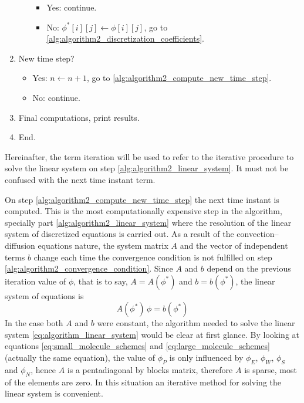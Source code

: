 \begin{algorithm}[ht]
\begin{algorithmic}[0]
\begin{enumerate}[label=\textbf{\arabic*},topsep=0pt]
\begin{enumerate}[label=\textbf{4.\arabic*}]
				\begin{itemize}
					\item Yes: continue.
					\item No: $\phi^\ast[i][j] \gets \phi[i][j]$, go to \ref{alg:algorithm2_discretization_coefficients}.
				\end{itemize}
			\end{enumerate}
			\item New time step?
			\begin{itemize}
				\item Yes: $n \gets n + 1$, go to \ref{alg:algorithm2_compute_new_time_step}.
				\item No: continue.
			\end{itemize}
			\item Final computations, print results.
			\item End.
		\end{enumerate}
	\end{algorithmic}
\end{algorithm}

Hereinafter, the term iteration will be used to refer to the iterative procedure
to solve the linear system on step \ref{alg:algorithm2_linear_system}. It must
not be confused with the next time instant term.

On step \ref{alg:algorithm2_compute_new_time_step} the next time instant is
computed. This is the most computationally expensive step in the algorithm,
specially part \ref{alg:algorithm2_linear_system} where the resolution of the
linear system of discretized equations is carried out. As a result of the
convection--diffusion equations nature, the system matrix $A$ and the vector of
independent terms $b$ change each time the convergence condition is not
fulfilled on step \eqref{alg:algorithm2_convergence_condition}. Since $A$ and
$b$ depend on the previous iteration value of $\phi$, that is to say, $A =
A(\phi^\ast)$ and $b = b(\phi^\ast)$, the linear system of equations is
\begin{equation} \label{eq:algorithm_linear_system}
	A(\phi^\ast) \, \phi = b(\phi^\ast)
\end{equation}
In the case both $A$ and $b$ were constant, the algorithm needed to solve the
linear system \eqref{eq:algorithm_linear_system} would be clear at first glance.
By looking at equations \eqref{eq:small_molecule_schemes} and
\eqref{eq:large_molecule_schemes} (actually the same equation), the value of
$\phi_P$ is only influenced by $\phi_E$, $\phi_W$, $\phi_S$ and $\phi_N$, hence
$A$ is a pentadiagonal by blocks matrix, therefore $A$ is sparse, \ie most of
the elements are zero. In this situation an iterative method for solving the
linear system is convenient. 

